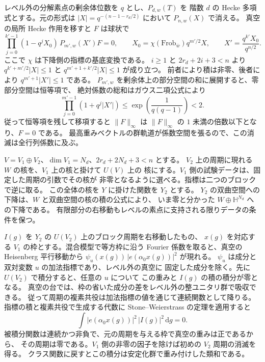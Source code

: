 レベル外の分解素点の剰余体位数を \(q\) とし、\(P_{d,w}(T)\) を
階数 \(d\) の Hecke 多項式とする。元の形式は
\(|X|=q^{-(n-1-r_d/2)}\) において \(P_{n,w}(X)\) で消える。
真空の局所 Hecke 作用を移すと \(F\) は球状で
\[
 \prod_{j=0}^{k'-1}(1-q^jX_0)\,P_{m',w}(X')F=0,\qquad
 X_0=\chi(\mathrm{Frob}_{\bar w})q^{m'/2}X,\qquad
 X'=\frac{q^{k'}X_0}{q^{n/2}} .
\]
ここで \(\chi\) は下降側の指標の基底変換である。
\(i\ge1\) と \(2r_d+2i+3<n\) より
\(q^{k'+m'/2}|X|\le1\) と \(q^{m'+1+k'/2}|X|\le1\) が成り立つ。
前者により積は非零、後者により \(q^{m'+1}|X'|\le1\) である。
\(P_{m',w}\) を剰余体上の部分空間の和に展開すると、零部分空間は恒等項で、
絶対係数の総和はガウス二項公式により
\[
 \prod_{j=0}^{m'-1}(1+q^j|X'|)
 \le\exp\!\left(\frac{1}{q(q-1)}\right)<2 .
\]
従って恒等項を残して移項すると \(\|F\|_\infty\) は
\(\|F\|_\infty\) の \(1\) 未満の倍数以下となり、\(F=0\) である。
最高重みベクトルの群軌道が係数空間を張るので、この消滅は全行列係数に及ぶ。

\(V=V_1\oplus V_2\)、\(\dim V_1=N_d\)、\(2r_d+2N_d+3<n\) とする。
\(V_2\) 上の周期に現れる \(W\) の核を、\(V_1\) 上の核と掛けて \(U(V)\) 上の
核にする。\(V_1\) 側の試験データは、固定した周期の引数でその核が
非零となるように選べる。指標は二つのブロックで逆に取る。
この全体の核を \(Y\) に掛けた関数を \(Y_2\) とする。
\(Y_2\) の双曲空間への下降は、\(W\) と双曲空間の核の積の公式により、
いま零と分かった \(W\oplus\mathbb H^{N_d}\) への下降である。
有限部分の右移動もレベルの素点に支持される限りデータの条件を保つ。

\(I(g)\) を \(Y_2\) の \(U(V_2)\) 上のブロック周期を右移動したもの、
\(x(g)\) を対応する \(V_1\) の枠とする。混合模型で等方枠に沿う Fourier
係数を取ると、真空の Heisenberg 平行移動から
\(\psi_u(x(g))\,|e(\alpha_0 x(g))|^2\) が現れる。
\(\psi_u\) は成分と双対変数 \(u\) の加法指標であり、レベル外の真空に
固定した成分を除く。先に \(U(V_2)\) で積分すると、任意の \(u\) について
この重みと \(I(g)\) の積の積分が零となる。
真空の台では、枠の省いた成分の差をレベル外の整ユニタリ群で吸収できる。
従って周期の複素共役は加法指標の値を通じて連続関数として降りる。
指標の積と複素共役で生成する代数に Stone--Weierstrass の定理を適用すると
\[
 \int |e(\alpha_0x(g))|^2\,|I(g)|^2\,\mathrm dg=0 .
\]
被積分関数は連続かつ非負で、元の周期を与える枠で真空の重みは正であるから、
その周期は零である。\(V_1\) 側の非零の因子を除けば初めの \(V_2\) 周期の消滅を得る。
クラス関数に戻すとこの積分は安定化群で重み付けした類和である。
